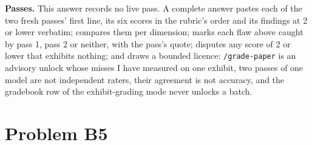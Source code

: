 \documentclass[11pt]{article}
\begin{document}
\begin{answer}
\textbf{Passes.} This answer records no live pass. A complete answer pastes
each of the two fresh passes' first line, its six scores in the rubric's
order and its findings at 2 or lower verbatim; compares them per dimension;
marks each flaw above caught by pass 1, pass 2 or neither, with the pass's
quote; disputes any score of 2 or lower that exhibits nothing; and draws a
bounded licence: \texttt{/grade-paper} is an advisory unlock whose misses I
have measured on one exhibit, two passes of one model are not independent
raters, their agreement is not accuracy, and the gradebook row of the
exhibit-grading mode never unlocks a batch.
\end{answer}
\section*{Problem B5}\label{ans:B5}
\end{document}
